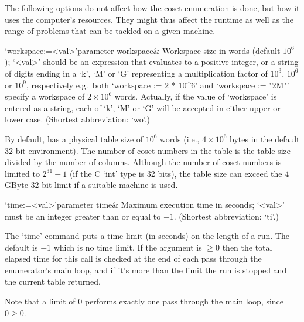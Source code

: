 \enditems


The following options do not affect how the coset enumeration is done,
but how it  uses the computer's resources. They  might thus affect the
runtime as  well as  the range of  problems that  can be tackled  on a
given machine.

\beginitems

\>`workspace:=<val>'{parameter workspace}&
Workspace size in words (default $10^6$);
`<val>' should be an expression that evaluates to a positive integer,
or a string of digits ending in a `k', `M' or `G' representing a
multiplication factor of $10^3$, $10^6$ or $10^9$, respectively
e.g.~both `workspace := 2 * 10^6' and `workspace := "2M"' specify
a workspace of $2\times10^6$ words. Actually, if the value of
`workspace' is entered as a string, each of `k', `M' or `G'
will be accepted in either upper or lower case.
(Shortest abbreviation: `wo'.)

By default, {\ACE} has a physical table size of $10^6$ words (i.e., $4
\times 10^6$ bytes in the  default 32-bit environment).  The number of
coset numbers in the table is  the table size divided by the number of
columns.   Although  the  number   of  coset  numbers  is  limited  to
$2^{31}-1$ (if the C `int' type is 32 bits), the table size can exceed
the $4$GByte 32-bit limit if a suitable machine is used.

\>`time:=<val>'{parameter time}&
Maximum execution time in seconds; `<val>' must be an integer greater
than or equal to $-1$. (Shortest abbreviation: `ti'.)

The `time' command  puts a time limit (in seconds) on  the length of a
run. The default is $-1$  which is no  time limit. If the  argument is
$\ge0$ then the total elapsed time for this call is checked at the end
of each pass through the enumerator's main loop, and if it's more than
the limit the run is stopped and the current table returned.

Note that a limit of $0$ performs exactly one pass through the main
loop, since $0 \ge 0$.

%
%
%


